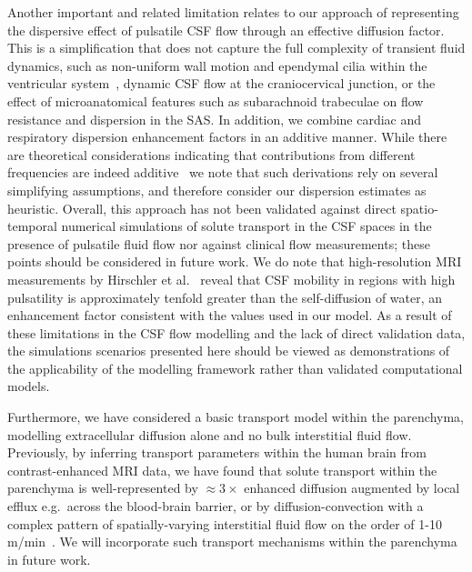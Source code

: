 \documentclass[fleqn,10pt]{wlscirep}
\begin{document}
Another important and related limitation relates to our approach of
representing the dispersive effect of pulsatile CSF flow through an
effective diffusion factor. This is a simplification that does not
capture the full complexity of transient fluid dynamics, such as
non-uniform wall motion and ependymal cilia within the ventricular
system~\cite{siyahhan2014flow}, dynamic CSF flow at the craniocervical
junction, or the effect of microanatomical features such as
subarachnoid trabeculae on flow resistance and dispersion in the
SAS. In addition, we combine cardiac and respiratory dispersion
enhancement factors in an additive manner. While there are theoretical
considerations indicating that contributions from different
frequencies are indeed additive~\cite{vedel2012transient} we note that
such derivations rely on several simplifying assumptions, and
therefore consider our dispersion estimates as heuristic. Overall,
this approach has not been validated against direct spatio-temporal
numerical simulations of solute transport in the CSF spaces in the
presence of pulsatile fluid flow nor against clinical flow
measurements; these points should be considered in future work. We do
note that high-resolution MRI measurements by Hirschler et
al.~\cite{hirschler2025region} reveal that CSF mobility in regions
with high pulsatility is approximately tenfold greater than the
self-diffusion of water, an enhancement factor consistent with the
values used in our model. As a result of these limitations in the
CSF flow modelling and the lack of direct validation data, the
simulations scenarios presented here should be viewed as
demonstrations of the applicability of the modelling framework rather
than validated computational models.

Furthermore, we have considered a basic transport model within the
parenchyma, modelling extracellular diffusion alone and no bulk
interstitial fluid flow. Previously, by inferring transport parameters
within the human brain from contrast-enhanced MRI data, we have found
that solute transport within the parenchyma is well-represented by
$\approx 3\times$ enhanced diffusion augmented by local efflux
e.g.~across the blood-brain barrier, or by diffusion-convection with a
complex pattern of spatially-varying interstitial fluid flow on the
order of 1-10 \textmu m/min~\cite{vinje2023human}. We will incorporate
such transport mechanisms within the parenchyma in future work. 
\end{document}
